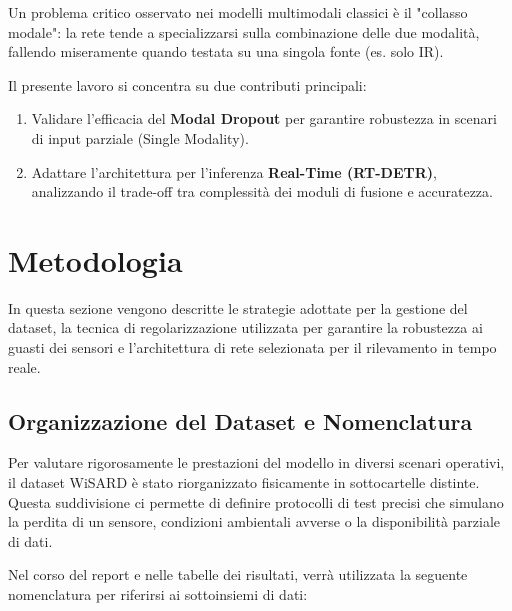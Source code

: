\documentclass[a4paper,12pt]{article}
\begin{document}
Un problema critico osservato nei modelli multimodali classici è il "collasso modale": la rete tende a specializzarsi sulla combinazione delle due modalità, fallendo miseramente quando testata su una singola fonte (es. solo IR).

\vspace{0.5cm}

\noindent Il presente lavoro si concentra su due contributi principali:
\begin{enumerate}
    \item Validare l'efficacia del \textbf{Modal Dropout} per garantire robustezza in scenari di input parziale (Single Modality).
    \item Adattare l'architettura per l'inferenza \textbf{Real-Time (RT-DETR)}, analizzando il trade-off tra complessità dei moduli di fusione e accuratezza.
\end{enumerate}


\newpage

\section{Metodologia}

In questa sezione vengono descritte le strategie adottate per la gestione del dataset, la tecnica di regolarizzazione utilizzata per garantire la robustezza ai guasti dei sensori e l'architettura di rete selezionata per il rilevamento in tempo reale.

\subsection{Organizzazione del Dataset e Nomenclatura}
Per valutare rigorosamente le prestazioni del modello in diversi scenari operativi, il dataset WiSARD è stato riorganizzato fisicamente in sottocartelle distinte. Questa suddivisione ci permette di definire protocolli di test precisi che simulano la perdita di un sensore, condizioni ambientali avverse o la disponibilità parziale di dati.

Nel corso del report e nelle tabelle dei risultati, verrà utilizzata la seguente nomenclatura per riferirsi ai sottoinsiemi di dati:
\end{document}
